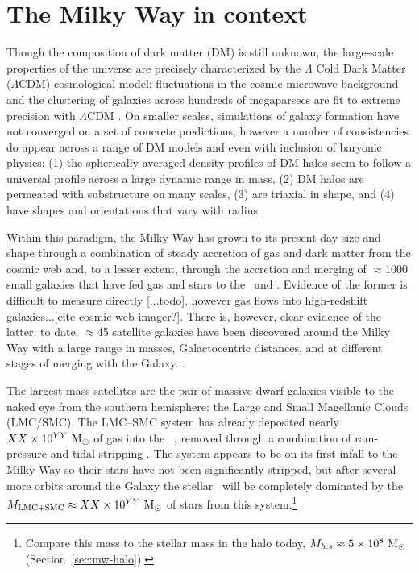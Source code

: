 \section{The Milky Way in context}\label{sec:mw-context}

Though the composition of dark matter (DM) is still unknown, the large-scale
properties of the universe are precisely characterized by the $\Lambda$ Cold
Dark Matter ($\Lambda$CDM) cosmological model: fluctuations in the cosmic
microwave background and the clustering of galaxies across hundreds of
megaparsecs are fit to extreme precision with $\Lambda$CDM \citep{planck15,
sanchez12}. On smaller scales, simulations of galaxy formation have not
converged on a set of concrete predictions, however a number of consistencies do
appear across a range of DM models and even with inclusion of baryonic physics:
(1) the spherically-averaged density profiles of DM halos seem to follow a
universal profile across a large dynamic range in mass, (2) DM halos are
permeated with substructure on many scales, (3) are triaxial in shape, and (4)
have shapes and orientations that vary with radius \citep{dubinski91, navarro96,
jing02, kuhlen07, veraciro11}.

Within this paradigm, the Milky Way has grown to its present-day size and shape
through a combination of steady accretion of gas and dark matter from the cosmic
web and, to a lesser extent, through the accretion and merging of $\approx$1000
small galaxies that have fed gas and stars to the \mwdisk\ and \mwhalo. Evidence
of the former is difficult to measure directly [...todo], however gas flows into
high-redshift galaxies...[cite cosmic web imager?]. There is, however, clear
evidence of the latter: to date, $\approx$45 satellite galaxies have been
discovered around the Milky Way with a large range in masses, Galactocentric
distances, and at different stages of merging with the Galaxy. .

The largest mass satellites are the pair of massive dwarf galaxies visible to
the naked eye from the southern hemisphere: the Large and Small Magellanic
Clouds (LMC/SMC). The LMC--SMC system has already deposited nearly $XX \times
10^{YY}~\mathrm{M}_\odot$ of gas into the \mwhalo\ \citep{putman-todo}, removed through a
combination of ram-pressure and tidal stripping \citep{salem-todo}. The system
appears to be on its first infall to the Milky Way \citep{besla10} so their
stars have not been significantly stripped, but after several more orbits around
the Galaxy the stellar \mwhalo\ will be completely dominated by the $M_{\rm
LMC+SMC} \approx XX \times 10^{YY}~\mathrm{M}_\odot$ of stars from this
system.\footnote{Compare this mass to the stellar mass in the halo today,
$M_{h:s} \approx 5 \times 10^8~\mathrm{M}_\odot$ (Section~\ref{sec:mw-halo}).}

